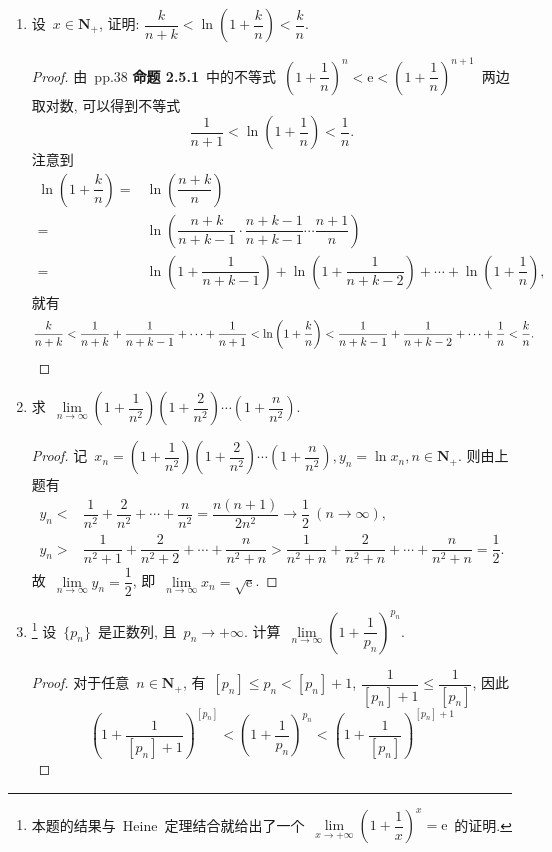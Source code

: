 \documentclass[UTF8,a4paper,10pt,twoside]{book}
\newcommand{\e}{\mathrm e}
\begin{document}
\begin{enumerate}
	\item 设~$x\in\mathbf{N}_{+}$, 证明: $\dfrac{k}{n+k}<\ln\left(1+\dfrac{k}{n}\right)<\dfrac{k}{n}$.
	      \begin{proof}
		      由~pp.38 {\bf 命题 2.5.1}~中的不等式~$\left(1+\dfrac{1}{n}\right)^n<\e<\left(1+\dfrac{1}{n}\right)^{n+1}$~两边取对数, 可以得到不等式
		      \[
			      \dfrac{1}{n+1}<\ln\left(1+\dfrac{1}{n}\right)<\dfrac{1}{n}.
		      \]
		      注意到
		      \[
			      \begin{split}
				      \ln\left(1+\dfrac{k}{n}\right)=&\ln\left(\dfrac{n+k}{n}\right)\\
				      =&\ln\left(\dfrac{n+k}{n+k-1}\cdot\dfrac{n+k-1}{n+k-1}\cdots\dfrac{n+1}{n}\right)\\
				      =&\ln\left(1+\dfrac{1}{n+k-1}\right)+\ln\left(1+\dfrac{1}{n+k-2}\right)+\cdots+\ln\left(1+\dfrac{1}{n}\right),
			      \end{split}
		      \]
		      就有
		      \[
			      \dfrac{k}{n+k}<\dfrac{1}{n+k}+\dfrac{1}{n+k-1}+\cdots+\dfrac{1}{n+1}<\ln\left(1+\dfrac{k}{n}\right)<\dfrac{1}{n+k-1}+\dfrac{1}{n+k-2}+\cdots+\dfrac{1}{n}<\dfrac{k}{n}.\qedhere
		      \]
	      \end{proof}
	\item 求~$\lim\limits_{n\to\infty} \left(1+\dfrac{1}{n^2}\right)\left(1+\dfrac{2}{n^2}\right)\cdots\left(1+\dfrac{n}{n^2}\right)$.
	      \begin{proof}
		      记~$x_n=\left(1+\dfrac{1}{n^2}\right)\left(1+\dfrac{2}{n^2}\right)\cdots\left(1+\dfrac{n}{n^2}\right), y_n=\ln{x_n}, n\in\mathbf{N}_{+}$. 则由上题有
		      \[
			      \begin{split}
				      y_n<&\dfrac{1}{n^2}+\dfrac{2}{n^2}+\cdots+\dfrac{n}{n^2}=\dfrac{n(n+1)}{2n^2}\to\dfrac{1}{2} \ (n\to\infty),\\
				      y_n>&\dfrac{1}{n^2+1}+\dfrac{2}{n^2+2}+\cdots+\dfrac{n}{n^2+n}>\dfrac{1}{n^2+n}+\dfrac{2}{n^2+n}+\cdots+\dfrac{n}{n^2+n}=\dfrac{1}{2}.
			      \end{split}
		      \]
		      故~$\lim\limits_{n\to\infty} y_n=\dfrac{1}{2}$, 即~$\lim\limits_{n\to\infty} x_n=\sqrt{\e}$.\qedhere
	      \end{proof}
	\item \footnote{本题的结果与~Heine~定理结合就给出了一个~$\lim\limits_{x\to+\infty} \left(1+\dfrac{1}{x}\right)^{x}=\e$~的证明.} 设~$\{p_n\}$~是正数列, 且~$p_n\to+\infty$. 计算~$\lim\limits_{n\to\infty} \left(1+\dfrac{1}{p_n}\right)^{p_n}$.
	      \begin{proof}
		      对于任意~$n\in\mathbf{N}_{+}$, 有~$[p_n]\leqslant p_n<[p_n]+1$, $\dfrac{1}{[p_n]+1}\leqslant\dfrac{1}{[p_n]}$, 因此
		      \[
			      \left(1+\dfrac{1}{[p_n]+1}\right)^{[p_n]}<\left(1+\dfrac{1}{p_n}\right)^{p_n}<\left(1+\dfrac{1}{[p_n]}\right)^{[p_n]+1}
		      \]


\end{proof}
\end{enumerate}
\end{document}
